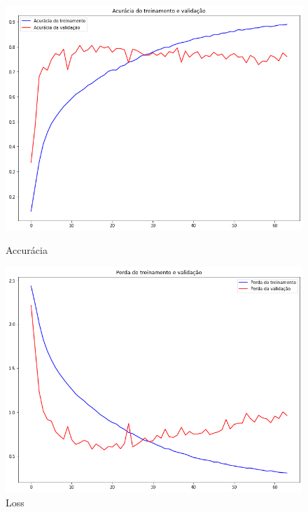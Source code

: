 \documentclass[12pt]{article}
\begin{document}
\begin{figure}[!htb]
  \begin{minipage}{.47\textwidth}
    \centering
    \includegraphics[width=1.1\linewidth]{experiments/default_aug_64/accuracy.png}
    \caption{Accurácia}\label{fig:experiment_default_aug_64_accuracy}
  \end{minipage}\hfill
  \begin{minipage}{.47\textwidth}
    \centering
    \includegraphics[width=1.1\linewidth]{experiments/default_aug_64/loss.png}
    \caption{Loss}\label{fig:experiment_default_aug_64_loss}
  \end{minipage}
\end{figure}
\end{document}
